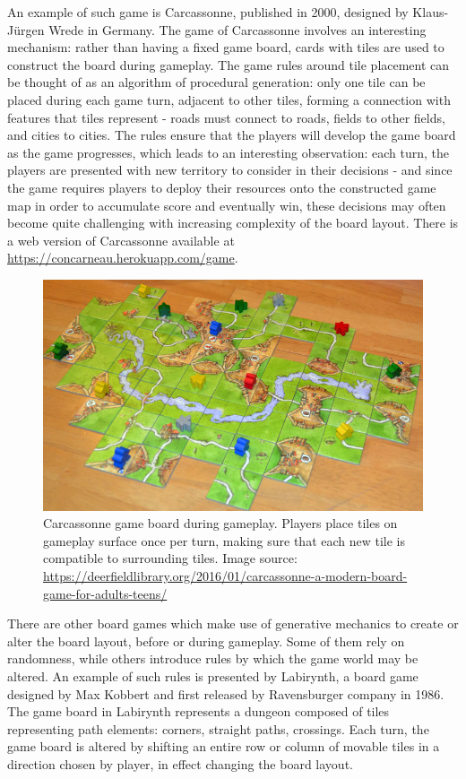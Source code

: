 \documentclass[12pt]{report}
\begin{document}
An example of such game is Carcassonne, published in 2000, designed by Klaus-Jürgen Wrede in Germany. The game of Carcassonne involves an interesting mechanism: rather than having a fixed game board, cards with tiles are used to construct the board during gameplay. The game rules around tile placement can be thought of as an algorithm of procedural generation: only one tile can be placed during each game turn, adjacent to other tiles, forming a connection with features that tiles represent - roads must connect to roads, fields to other fields, and cities to cities. The rules ensure that the players will develop the game board as the game progresses, which leads to an interesting observation: each turn, the players are presented with new territory to consider in their decisions - and since the game requires players to deploy their resources onto the constructed game map in order to accumulate score and eventually win, these decisions may often become quite challenging with increasing complexity of the board layout. There is a web version of Carcassonne available at \url{https://concarneau.herokuapp.com/game}.

\begin{figure}[h]
	\centering
	\includegraphics[width=0.7\linewidth]{images/carcassonne}
	\caption{Carcassonne game board during gameplay. Players place tiles on gameplay surface once per turn, making sure that each new tile is compatible to surrounding tiles. Image source: \url{https://deerfieldlibrary.org/2016/01/carcassonne-a-modern-board-game-for-adults-teens/}}
	\label{fig:carcassonne}
\end{figure}

There are other board games which make use of generative mechanics to create or alter the board layout, before or during gameplay. Some of them rely on randomness, while others introduce rules by which the game world may be altered. An example of such rules is presented by Labirynth, a board game designed by Max Kobbert and first released by Ravensburger company in 1986. The game board in Labirynth represents a dungeon composed of tiles representing path elements: corners, straight paths, crossings. Each turn, the game board is altered by shifting an entire row or column of movable tiles in a direction chosen by player, in effect changing the board layout.  
\end{document}
